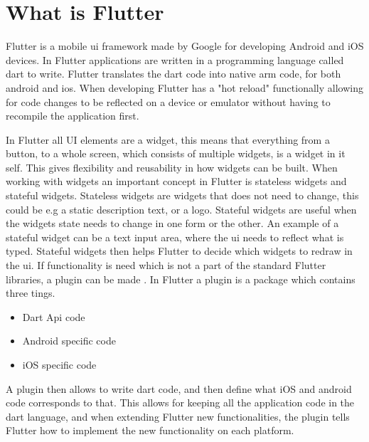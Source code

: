 \section{What is Flutter}


Flutter is a mobile \gls{ui} framework made by Google for developing Android and iOS devices\cite{flutterFAQ}. In Flutter applications  are written in a programming language called dart  to write. Flutter translates the dart code into native arm code, for both android and ios.
When developing Flutter has a "hot reload" functionally allowing for code changes to be reflected on a device or emulator without having to recompile the application first.

In Flutter all UI elements are a widget, this means that everything from a  button, to a  whole screen, which consists of multiple widgets, is a widget in it self. This gives flexibility and reusability in how widgets can be built. When working with widgets an important concept in Flutter is stateless widgets and stateful widgets. Stateless widgets are widgets that does not need to change, this could be  e.g a static description text, or a logo. Stateful widgets are useful when the widgets state needs to change in one form or the other.  An example of a stateful widget can be a text input area, where the \gls{ui} needs to reflect what is typed. Stateful widgets then helps Flutter to decide which widgets to redraw in the \gls{ui}.
If functionality is need which is not a part of the standard Flutter libraries, a plugin can be made \cite{docker_plugins}. In Flutter a plugin is a package which contains three tings.

\begin{itemize}
    \item  Dart Api code
    \item  Android specific code
    \item  iOS specific code
\end{itemize}

A plugin then allows to write dart code, and then define what iOS and android code corresponds to that. This allows for keeping all the application code in the dart language, and when extending Flutter new functionalities, the plugin tells Flutter how to implement the new functionality on each platform.